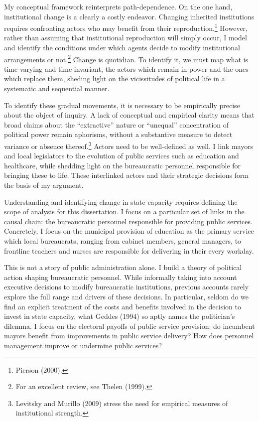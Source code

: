 \documentclass[12pt,]{article}
\let\rmarkdownfootnote\footnote%
\def\footnote{\protect\rmarkdownfootnote}
\begin{document}
My conceptual framework reinterprets path-dependence. On the one hand,
institutional change is a clearly a costly endeavor. Changing inherited
institutions requires confronting actors who may benefit from their
reproduction.\footnote{Pierson (2000).} However, rather than assuming
that institutional reproduction will simply occur, I model and identify
the conditions under which agents decide to modify institutional
arrangements or not.\footnote{For an excellent review, see Thelen
  (1999).} Change is quotidian. To identify it, we must map what is
time-varying and time-invariant, the actors which remain in power and
the ones which replace them, sheding light on the vicissitudes of
political life in a systematic and sequential manner.

To identify these gradual movements, it is necessary to be empirically
precise about the object of inquiry. A lack of conceptual and empirical
clarity means that broad claims about the ``extractive'' nature or
``unequal'' concentration of political power remain aphorisms, without a
substantive measure to detect variance or absence thereof.\footnote{Levitsky
  and Murillo (2009) stress the need for empirical measures of
  institutional strength.} Actors need to be well-defined as well. I
link mayors and local legislators to the evolution of public services
such as education and healthcare, while shedding light on the
bureaucratic personnel responsible for bringing these to life. These
interlinked actors and their strategic decisions form the basis of my
argument.

Understanding and identifying change in state capacity requires defining
the scope of analysis for this dissertation. I focus on a particular set
of links in the causal chain: the bureaucratic personnel responsible for
providing public services. Concretely, I focus on the municipal
provision of education as the primary service which local bureaucrats,
ranging from cabinet members, general managers, to frontline teachers
and nurses are responsible for delivering in their every workday.

This is not a story of public administration alone. I build a theory of
political action shaping bureaucratic personnel. While informally taking
into account executive decisions to modify bureaucratic institutions,
previous accounts rarely explore the full range and drivers of these
decisions. In particular, seldom do we find an explicit treatment of the
costs and benefits involved in the decision to invest in state capacity,
what Geddes (1994) so aptly names the politician's dilemma. I focus on
the electoral payoffs of public service provision: do incumbent mayors
benefit from improvements in public service delivery? How does personnel
management improve or undermine public services?
\end{document}
